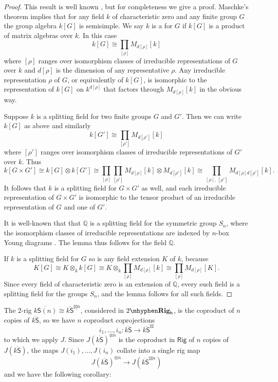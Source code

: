 \documentclass[12pt,reqno]{amsart}
\theoremstyle{plain}
\theoremstyle{definition}
\theoremstyle{remark}
\newcommand{\define}[1]{{\bf \boldmath{#1}}\index{#1}}
\newcommand{\maps}{\colon}
\newcommand{\Q}{\mathbb{Q}}
\newcommand{\category}[1]{\mathsf{#1}}
\renewcommand{\S}{\category S}
\newcommand{\namedcat}[1]{\mathsf{#1}}
\newcommand{\Rig}{\namedcat{Rig}}
\newcommand{\TRig}{2\mhyphen\namedbicat{Rig}}
\newcommand{\namedbicat}[1]{\mathbf{#1}}
\newcommand{\ho}{_\mathsf{h}}
\newcommand{\ksbar}{\overline{k\S}}
\numberwithin{thm}{section}
\begin{document}
\begin{proof}  
This result is well known \cite{RepTheorySn}, but for completeness we give a proof. Maschke's theorem implies that for any field $k$ of characteristic zero and any finite group $G$ the group algebra $k[G]$ is semisimple. We say $k$ is a \define{splitting field} for $G$ if $k[G]$ is a product of matrix algebras over $k$. In this case
\[   k[G] \cong \prod_{[\rho]} M_{d[\rho]}[k]   \]
where $[\rho]$ ranges over isomorphism classes of irreducible representations of $G$ over $k$ and $d[\rho]$ is the dimension of any representative $\rho$. Any irreducible representation $\rho$ of $G$, or equivalently of $k[G]$, is isomorphic to the representation of $k[G]$ on $k^{d[\rho]}$ that factors through $M_{d[\rho]}[k]$ in the obvious way.

Suppose $k$ is a splitting field for two finite groups $G$ and $G'$. Then we can write $k[G]$ as above and similarly 
\[   k[G'] \cong \prod_{[\rho']} M_{d[\rho']}[k]   \]
where $[\rho']$ ranges over isomorphism classes of irreducible representations of $G'$ over $k$. Thus 
\[   k[G \times G'] \cong k[G] \otimes k[G'] \cong 
\prod_{[\rho]} \prod_{[\rho']} M_{d[\rho]}[k] \otimes M_{d[\rho']}[k] \cong 
\prod_{[\rho], \, [\rho']} M_{d[\rho] d[\rho']}[k]  . \]
It follows that $k$ is a splitting field for $G \times G'$ as well, and each irreducible representation of $G \times G'$ is isomorphic to the tensor product of an irreducible representation of $G$ and one of $G'$. 

It is well-known that that $\Q$ is a splitting field for the symmetric group $S_n$, where the isomorphism classes of irreducible representations are indexed by $n$-box Young diagrams \cite[Corollary 4.16]{Lorenz}. The lemma thus follows for the field $\Q$.

If $k$ is a splitting field for $G$ so is any field extension $K$ of $k$, because
\[   K[G] \cong K \otimes_k k[G] \cong K \otimes_k \prod_{[\rho]}  M_{d[\rho]}[k]   \cong \prod_{[\rho]} M_{d[\rho]}[K] . \] 
Since every field of characteristic zero is an extension of $\Q$, every such field is a splitting field for the groups $S_n$, and the lemma follows for all such fields. \end{proof}

The 2-rig $\overline{k\S(n)} \cong \ksbar^{\boxtimes n}$, considered in $\TRig\ho$, is the coproduct of $n$ copies of $\ksbar$, so we have $n$ coproduct coprojections 
\[
i_1, \ldots, i_n\maps  \ksbar \to \ksbar^\boxtimes
\]
to which we apply $J$. Since $J(\ksbar)^{\otimes n}$ is the coproduct in $\Rig$ of $n$ copies of $J(\ksbar)$, the maps $J(i_1), \ldots, J(i_n)$ collate into a single rig map 
\[
J(\ksbar)^{\otimes n} \to J(\ksbar^{\boxtimes n})
\]
and we have the following corollary: 
\end{document}
